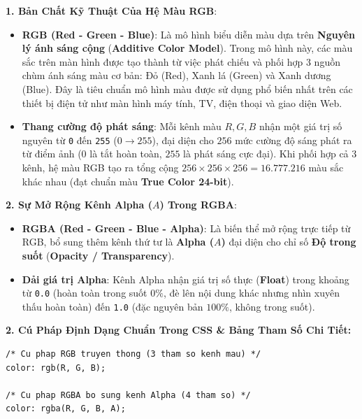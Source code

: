\documentclass[11pt,oneside]{book}
\newcommand{\codeinline}[1]{\textcolor{accentOrange}{\texttt{#1}}}
\newcommand{\term}[1]{\textbf{\textcolor{primaryBlue}{#1}}}
\begin{document}
\begin{conceptBox}
\textbf{1. Bản Chất Kỹ Thuật Của Hệ Màu RGB}:
\begin{itemize}[leftmargin=1.5em, itemsep=3pt, parsep=0pt]
    \item \textbf{RGB (Red - Green - Blue)}: Là mô hình biểu diễn màu dựa trên \term{Nguyên lý ánh sáng cộng} (\term{Additive Color Model}). Trong mô hình này, các màu sắc trên màn hình được tạo thành từ việc phát chiếu và phối hợp 3 nguồn chùm ánh sáng màu cơ bản: Đỏ (Red), Xanh lá (Green) và Xanh dương (Blue). Đây là tiêu chuẩn mô hình màu được sử dụng phổ biến nhất trên các thiết bị điện tử như màn hình máy tính, TV, điện thoại và giao diện Web.
    \item \textbf{Thang cường độ phát sáng}: Mỗi kênh màu $R, G, B$ nhận một giá trị số nguyên từ \codeinline{0} đến \codeinline{255} ($0 \rightarrow 255$), đại diện cho $256$ mức cường độ sáng phát ra từ điểm ảnh ($0$ là tắt hoàn toàn, $255$ là phát sáng cực đại). Khi phối hợp cả 3 kênh, hệ màu RGB tạo ra tổng cộng $256 \times 256 \times 256 = 16.777.216$ màu sắc khác nhau (đạt chuẩn màu \term{True Color 24-bit}).
\end{itemize}

\textbf{2. Sự Mở Rộng Kênh Alpha ($A$) Trong RGBA}:
\begin{itemize}[leftmargin=1.5em, itemsep=3pt, parsep=0pt]
    \item \textbf{RGBA (Red - Green - Blue - Alpha)}: Là biến thể mở rộng trực tiếp từ RGB, bổ sung thêm kênh thứ tư là \textbf{Alpha ($A$)} đại diện cho chỉ số \term{Độ trong suốt} (\term{Opacity / Transparency}).
    \item \textbf{Dải giá trị Alpha}: Kênh Alpha nhận giá trị số thực (\term{Float}) trong khoảng từ \codeinline{0.0} (hoàn toàn trong suốt $0\%$, đè lên nội dung khác nhưng nhìn xuyên thấu hoàn toàn) đến \codeinline{1.0} (đặc nguyên bản $100\%$, không trong suốt).
\end{itemize}
\end{conceptBox}

\textbf{2. Cú Pháp Định Dạng Chuẩn Trong CSS \& Bảng Tham Số Chi Tiết:}
\begin{codeWindow}
\begin{lstlisting}[language=CSS3]
/* Cu phap RGB truyen thong (3 tham so kenh mau) */
color: rgb(R, G, B);

/* Cu phap RGBA bo sung kenh Alpha (4 tham so) */
color: rgba(R, G, B, A);
\end{lstlisting}
\end{codeWindow}
\end{document}
